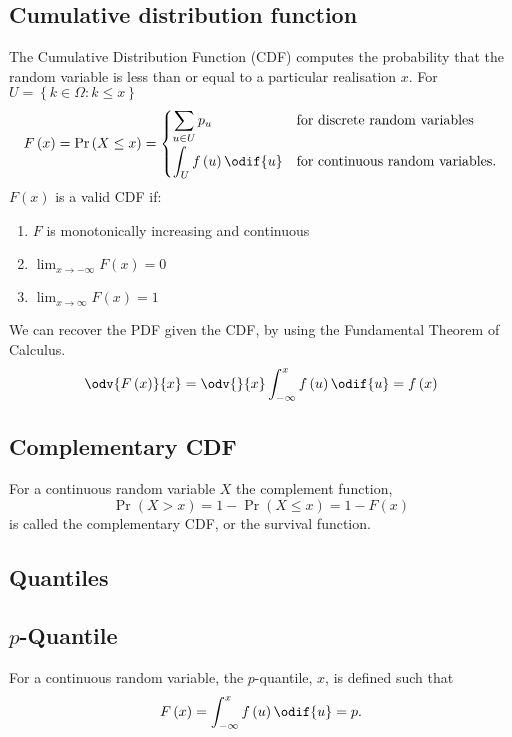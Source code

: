 \documentclass{article}
\begin{document}
\begin{multicols}{3}
    \subsection{Cumulative distribution function}
    The Cumulative Distribution Function (CDF) computes the probability that the random variable is
    less than or equal to a particular realisation \(x\). For \(U = \left\{ k \in \Omega : k \leq x \right\}\)
    \begin{equation*}
        F\left( x \right) = \Pr{\left( X \leq x \right)} = \begin{cases}
            \displaystyle \sum_{u \in U} p_u                  & \text{for discrete random variables}    \\[0.4cm]
            \displaystyle \int_{U} f\left( u \right) \odif{u} & \text{for continuous random variables}.
        \end{cases}
    \end{equation*}
    \(F\left( x \right)\) is a valid CDF if:
    \begin{enumerate}
        \item \(F\) is monotonically increasing and continuous
        \item \(\lim_{x \to -\infty} F\left( x \right) = 0\)
        \item \(\lim_{x \to \infty} F\left( x \right) = 1\)
    \end{enumerate}
    We can recover the PDF given the CDF, by using the Fundamental Theorem of Calculus.
    \begin{equation*}
        \odv{F\left( x \right)}{x} = \odv{}{x} \int_{-\infty}^x f\left( u \right) \odif{u} = f\left( x \right)
    \end{equation*}
    \subsection{Complementary CDF}
    For a continuous random variable \(X\) the complement function,
    \begin{equation*}
        \Pr{\left( X > x \right)} = 1 - \Pr{\left( X \leq x \right)} = 1 - F\left( x \right)
    \end{equation*}
    is called the complementary CDF, or the survival function.
    \subsection{Quantiles}
    \subsection{\(p\)-Quantile}
    For a continuous random variable, the \(p\)-quantile, \(x\), is defined such that
    \begin{equation*}
        F\left( x \right) = \int_{-\infty}^x f\left( u \right) \odif{u} = p.
    \end{equation*}

\end{multicols}
\end{document}

